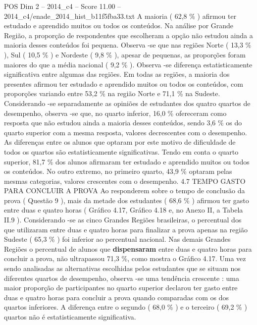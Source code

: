\begin{textsample}{POS Dim 2 – 2014\_c4 – Score 11.00 – 2014\_c4/enade\_2014\_hist\_b11f5fba33.txt}
A maioria ( 62,8 \% ) afirmou ter estudado e aprendido muitos ou todos os conteúdos.
Na análise por Grande Região, a proporção de respondentes que escolheram a opção não estudou ainda a maioria desses conteúdos foi pequena.
Observa -se que nas regiões Norte ( 13,3 \% ), Sul ( 10,5 \% ) e Nordeste ( 9,8 \% ), apesar de pequenas, as proporções foram maiores do que a média nacional ( 9,2 \% ).
Observa -se diferença estatisticamente significativa entre algumas das regiões.
Em todas as regiões, a maioria dos presentes afirmou ter estudado e aprendido muitos ou todos os conteúdos, com proporções variando entre 53,2 \% na região Norte e 71,1 \% na Sudeste.
Considerando -se separadamente as opiniões de estudantes dos quatro quartos de desempenho, observa -se que, no quarto inferior, 16,0 \% ofereceram como resposta que não estudou ainda a maioria desses conteúdos, sendo 3,6 \% os do quarto superior com a mesma resposta, valores decrescentes com o desempenho.
As diferenças entre os alunos que optaram por este motivo de dificuldade de todos os quartos são estatisticamente significativas.
Tendo em conta o quarto superior, 81,7 \% dos alunos afirmaram ter estudado e aprendido muitos ou todos os conteúdos.
No outro extremo, no primeiro quarto, 43,9 \% optaram pelas mesmas categorias, valores crescentes com o desempenho. 4.7 TEMPO GASTO PARA CONCLUIR A PROVA Ao responderem sobre o tempo de conclusão da prova ( Questão 9 ), mais da metade dos estudantes ( 68,6 \% ) afirmou ter gasto entre duas e quatro horas ( Gráfico 4.17, Gráfico 4.18 e, no Anexo II, a Tabela II.9 ).
Considerando -se as cinco Grandes Regiões brasileiras, o percentual dos que utilizaram entre duas e quatro horas para finalizar a prova apenas na região Sudeste ( 65,3 \% ) foi inferior ao percentual nacional.
Nas demais Grandes Regiões o percentual de alunos que \textbf{dispensaram} entre duas e quatro horas para concluir a prova, não ultrapassou 71,3 \%, como mostra o Gráfico 4.17.
Uma vez sendo analisadas as alternativas escolhidas pelos estudantes que se situam nos diferentes quartos de desempenho, observa -se uma tendência crescente : uma maior proporção de participantes no quarto superior declarou ter gasto entre duas e quatro horas para concluir a prova quando comparadas com os dos quartos inferiores.
A diferença entre o segundo ( 68,0 \% ) e o terceiro ( 69,2 \% ) quartos não é estatisticamente significativa.

\end{textsample}
